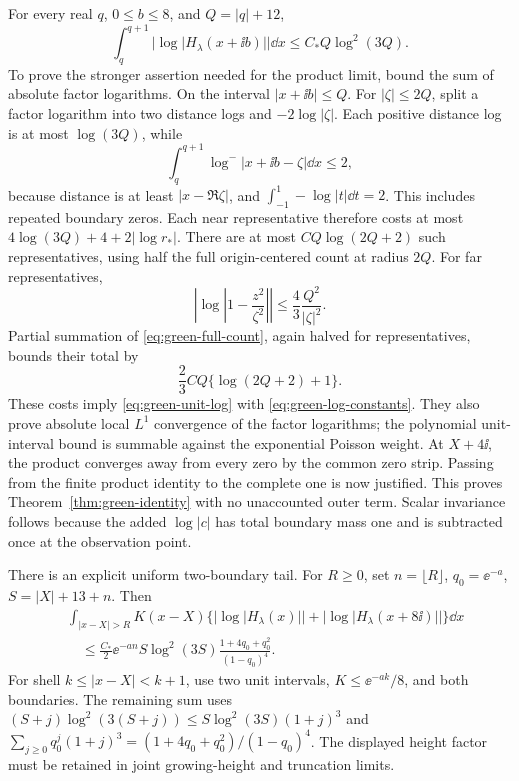 For every real \(q\), \(0\le b\le8\), and \(Q=|q|+12\),
\begin{equation}\label{eq:green-unit-log}
 \int_q^{q+1}|\log|H_\lambda(x+\ii b)||\dd x
                  \le C_*Q\log^2(3Q).
\end{equation}
To prove the stronger assertion needed for the product limit, bound the
sum of absolute factor logarithms. On the interval \(|x+\ii b|\le Q\).
For \(|\zeta|\le2Q\), split a factor logarithm into two distance logs
and \(-2\log|\zeta|\). Each positive distance log is at most
\(\log(3Q)\), while
\[
 \int_q^{q+1}\log^-|x+\ii b-\zeta|\dd x\le2,
\]
because distance is at least \(|x-\Re\zeta|\), and
\(\int_{-1}^1-\log|t|\dd t=2\). This includes repeated boundary
zeros. Each near representative therefore costs at most
\(4\log(3Q)+4+2|\log r_*|\). There are at most
\(CQ\log(2Q+2)\) such representatives, using half the full
origin-centered count at radius \(2Q\).
For far representatives,
\[
 \left|\log\left|1-\frac{z^2}{\zeta^2}\right|\right|
         \le\frac43\frac{Q^2}{|\zeta|^2}.
\]
Partial summation of \eqref{eq:green-full-count}, again halved for
representatives, bounds their total by
\[
 \frac23CQ\{\log(2Q+2)+1\}.
\]
These costs imply
\eqref{eq:green-unit-log} with \eqref{eq:green-log-constants}.
They also prove absolute local \(L^1\) convergence of the factor
logarithms; the polynomial unit-interval bound is summable against
the exponential Poisson weight. At \(X+4\ii\), the product converges
away from every zero by the common zero strip. Passing from the finite
product identity to the complete one is now justified. This proves
Theorem~\ref{thm:green-identity} with no unaccounted outer term.
Scalar invariance follows because the added \(\log|c|\) has total
boundary mass one and is subtracted once at the observation point.

There is an explicit uniform two-boundary tail. For \(R\ge0\), set
\(n=\lfloor R\rfloor\), \(q_0=\ee^{-a}\), \(S=|X|+13+n\). Then
\begin{align}\label{eq:green-boundary-tail}
 &\int_{|x-X|>R}K(x-X)
   \{|\log|H_\lambda(x)||+|\log|H_\lambda(x+8\ii)||\}\dd x
 \nonumber\\
 &\quad\le\frac{C_*}{2}\ee^{-an}S\log^2(3S)
                        \frac{1+4q_0+q_0^2}{(1-q_0)^4}.
\end{align}
For shell \(k\le|x-X|<k+1\), use two unit intervals,
\(K\le\ee^{-ak}/8\), and both boundaries. The remaining sum uses
\((S+j)\log^2(3(S+j))\le S\log^2(3S)(1+j)^3\) and
\(\sum_{j\ge0}q_0^j(1+j)^3=(1+4q_0+q_0^2)/(1-q_0)^4\).
The displayed height factor must be retained in joint growing-height
and truncation limits.

